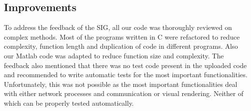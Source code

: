 \subsection{Improvements}
To address the feedback of the SIG, all our code was thoroughly reviewed on complex methods. Most of the programs written in C were refactored to reduce complexity, function length and duplication of code in different programs. Also our Matlab code was adapted to reduce function size and complexity.
The feedback also mentioned that there was no test code present in the uploaded code and recommended to write automatic tests for the most important functionalities. Unfortunately, this was not possible as the most important functionalities deal with either network processes and communication or visual rendering. Neither of which can be properly tested automatically.

 